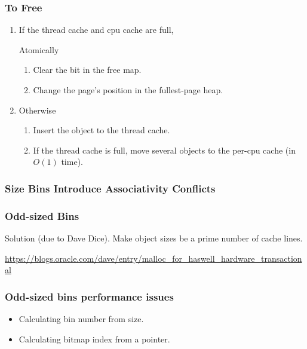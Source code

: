 \documentclass[xcolor=dvipsnames,14pt]{beamer}
\begin{document}
\begin{frame}
\frametitle{To Free}
\begin{enumerate}
\item If the thread cache and cpu cache are full, 

 Atomically
 \begin{enumerate}
 \item Clear the bit in the free map.
 \item Change the page's position in the fullest-page heap.
 \end{enumerate}
\item Otherwise 
 \begin{enumerate}
 \item Insert the object to the thread cache.
 \item If the thread cache is full, move several objects to the per-cpu cache (in $O(1)$ time).
 \end{enumerate}
\end{enumerate}
\end{frame}

\begin{frame}[fragile]
\frametitle{Size Bins Introduce Associativity Conflicts}

\end{frame}

\begin{frame}
\frametitle{Odd-sized Bins}

Solution (due to Dave Dice).  Make object sizes be a prime number of cache lines.

\url{https://blogs.oracle.com/dave/entry/malloc_for_haswell_hardware_transactional}


\end{frame}

\begin{frame}
\frametitle{Odd-sized bins performance issues}

\begin{itemize}
\item Calculating bin number from size.
\item Calculating bitmap index from a pointer.
\end{itemize}
\end{frame}
\end{document}
